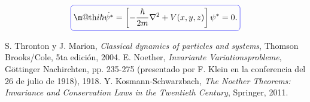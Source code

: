 \documentclass[a4paper,10pt]{article}
\makeatletter
\numberwithin{equation}{section}
\newcommand*{\boxcolor}{blue}
\renewcommand{\boxed}[1]{\textcolor{\boxcolor}{%
\tikz[baseline={([yshift=-1ex]current bounding box.center)}] \node [rectangle, minimum width=1ex,rounded corners,draw] {\normalcolor\m@th$\displaystyle#1$};}}
\makeatother
\begin{document}
\begin{equation}
 \boxed{i\hbar\dot{\psi^*} = \left[-\frac{\hbar}{2m}\nabla^2 + V(x,y,z)\right]\psi^* = 0.}
 \label{eq:shro5}
\end{equation}






\begin{thebibliography}{10}
 S. Thronton y J. Marion, \textit{Classical dynamics of particles and systems}, Thomson Brooks/Cole,
 5ta edición, 2004.
E. Noether, \emph{Invariante Variationsprobleme}, Göttinger Nachirchten, pp. 235-275
(presentado por F. Klein en la conferencia del 26 de julio de 1918), 1918.
Y. Kosmann-Schwarzbach, \emph{The Noether Theorems: Invariance and Conservation Laws 
in the Twentieth Century}, Springer, 2011.


\end{thebibliography}
\end{document}
